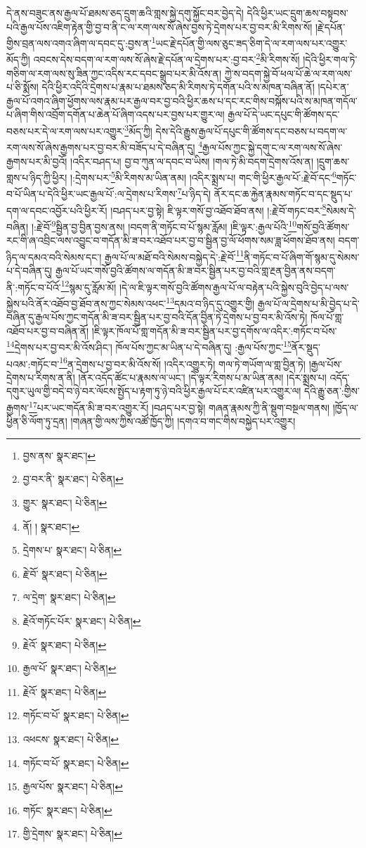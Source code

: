 དེ་ནས་བཟུང་ནས་རྒྱལ་པོ་ཐམས་ཅད་དྲུག་ཆའི་གླས་སྐྱེ་དགུ་སྐྱོང་བར་བྱེད་དེ། དེའི་ཕྱིར་ཡང་དྲུག་ཆས་བསྟབས་པའི་རྒྱལ་པོས་འཇིག་རྟེན་གྱི་བྱ་བ་ནི་ང་ལ་རག་ལས་སོ་ཞེས་བྱས་ཏེ་དྲེགས་པར་བྱ་བར་མི་རིགས་སོ། །རྗེ་དཔོན་གྱིས་བྲན་ལས་འགའ་ཞིག་ལ་དབང་དུ་:བྱས་ན་\footnote{བྱས་ནས་  སྣར་ཐང་། }ཡང་རྗེ་དཔོན་གྱི་ལས་ཅུང་ཟད་ཅིག་དེ་ལ་རག་ལས་པར་འགྱུར་མོད་ཀྱི། འབངས་དེས་བདག་ལ་རག་ལས་སོ་ཞེས་རྗེ་དཔོན་ལ་དྲེགས་པར་:བྱ་བར་\footnote{བྱ་བར་ནི་  སྣར་ཐང་།  པེ་ཅིན། }མི་རིགས་སོ། །དེའི་ཕྱིར་གལ་ཏེ་གཅིག་ལ་རག་ལས་སུ་ཟིན་ཀྱང་འདིས་རང་དབང་སྒྲུབ་པར་མི་འོས་ན། ཀྱེ་ས་བདག་སྐྱེ་བོ་ཕལ་པོ་ཆེ་ལ་རག་ལས་པ་ཅི་སྨོས། དེའི་ཕྱིར་འདིའི་དྲེགས་པ་རྣམ་པ་ཐམས་ཅད་མི་རིགས་ཏེ་དགོན་པའི་ས་མཁན་བཞིན་ནོ། །དཔེར་ན་རྒྱལ་པོ་འགའ་ཞིག་ཕྱོགས་ལས་རྣམ་པར་རྒྱལ་བར་བྱ་བའི་ཕྱིར་ཆས་པ་དང་རང་གིས་བསྐོས་པའི་ས་མཁན་གདོལ་པ་ཞིག་གིས་འབྲོག་དགོན་པ་ཆེན་པོ་ཞིག་འདས་པར་བྱས་པར་གྱུར་ལ། རྒྱལ་པོ་དེ་ཡང་དཔུང་གི་ཚོགས་དང་བཅས་པར་དེ་ལ་རག་ལས་པར་འགྱུར་\footnote{གྱུར་  སྣར་ཐང་།  པེ་ཅིན། }མོད་ཀྱི། དེས་དེའི་རྒྱུས་རྒྱལ་པོ་དཔུང་གི་ཚོགས་དང་བཅས་པ་བདག་ལ་རག་ལས་སོ་ཞེས་རྒྱགས་པར་བྱ་བར་མི་བཟོད་པ་དེ་བཞིན་དུ། \footnote{ནོ། །   སྣར་ཐང་། }རྒྱལ་པོས་ཀྱང་སྐྱེ་དགུ་ང་ལ་རག་ལས་སོ་ཞེས་རྒྱགས་པར་མི་བྱའོ། །འདིར་བཤད་པ། བྱ་བ་ཀུན་ལ་དབང་བ་ཡིས། །གལ་ཏེ་མི་བདག་དྲེགས་འོས་ན། །དྲུག་ཆས་གླས་པ་ཉིད་ཀྱི་ཕྱིར། །:དྲེགས་པར་\footnote{དྲེགས་པ་  སྣར་ཐང་།  པེ་ཅིན། }མི་རིགས་མ་ཡིན་ནམ། །འདིར་སྨྲས་པ། གང་གི་ཕྱིར་རྒྱལ་པོ་:རྗེ་བོ་དང་\footnote{རྗེ་བོ་  སྣར་ཐང་།  པེ་ཅིན། }གཏོང་བ་པོ་ཡིན་པ་དེའི་ཕྱིར་ཡང་རྒྱལ་པོ་:ལ་དྲེགས་པ་རིགས་\footnote{ལ་དྲེག་  སྣར་ཐང་།  པེ་ཅིན། }པ་ཉིད་དེ། ནོར་དང་ཆ་རྐྱེན་རྣམས་གཏོང་བ་དང་སྡུད་པ་དག་ལ་དབང་འབྱོར་པའི་ཕྱིར་རོ། །བཤད་པར་བྱ་སྟེ། ཇི་ལྟར་གསོ་བྱ་འཐོབ་ཐོབ་ནས། །:རྗེ་བོ་གཏང་བར་\footnote{རྗེའོ་གཏོང་པོར་  སྣར་ཐང་།  པེ་ཅིན། }སེམས་དེ་བཞིན། །:རྗེ་བོ་\footnote{རྗེའོ་  སྣར་ཐང་།  པེ་ཅིན། }སྦྱིན་བྱ་བྱིན་བྱས་ནས། །བདག་ནི་གཏོང་བ་པོ་སྙམ་རློམ། །ཇི་ལྟར་:རྒྱལ་པོའི་\footnote{རྒྱལ་པོ་  སྣར་ཐང་།  པེ་ཅིན། }གསོ་བྱའི་ཚོགས་རང་གི་ཞ་འབྲིང་ལས་འབྱུང་བ་གདོན་མི་ཟ་བར་འཐོབ་པར་བྱ་བ་སྦྱིན་བྱ་ལོ་ཕོགས་སམ་ཟླ་ཕོགས་ཐོབ་ནས། བདག་ཉིད་ལ་དམའ་བའི་སེམས་དང་། རྒྱལ་པོ་ལ་མཐོ་བའི་སེམས་བསྐྱེད་དེ་:རྗེ་བོ་\footnote{རྗེའོ་  སྣར་ཐང་།  པེ་ཅིན། }ནི་གཏོང་བ་པོ་ཞིག་གོ་སྙམ་དུ་སེམས་པ་དེ་བཞིན་དུ། རྒྱལ་པོ་ཡང་གསོ་བྱའི་ཚོགས་ལ་གདོན་མི་ཟ་བར་སྦྱིན་པར་བྱ་བའི་གླ་རྔན་བྱིན་ནས་བདག་ནི་:གཏོང་བ་པོའོ་\footnote{གཏོང་བ་པོ་  སྣར་ཐང་།  པེ་ཅིན། }སྙམ་དུ་རློམ་མོ། །དེ་ལ་ཇི་ལྟར་གསོ་བྱའི་ཚོགས་རྒྱལ་པོ་ལ་བརྟེན་པའི་སྐྱེས་བུའི་བྱེད་པ་ལས་སྐྱེས་པའི་ནོར་འཐོབ་བྱ་ཐོབ་ནས་ཀྱང་སེམས་འཕང་\footnote{འཕངས་  སྣར་ཐང་།  པེ་ཅིན། }དམའ་བ་ཉིད་དུ་འགྱུར་གྱི། རྒྱལ་པོ་ལ་དྲེགས་པ་མི་བྱེད་པ་དེ་བཞིན་དུ་རྒྱལ་པོས་ཀྱང་གདོན་མི་ཟ་བར་སྦྱིན་པར་བྱ་བའི་དོན་བྱིན་ཏེ་དྲེགས་པ་བྱ་བར་མི་འོས་ཏེ། ཁོལ་པོ་གླ་འཐོབ་པར་བྱ་བ་བཞིན་ནོ། །ཇི་ལྟར་ཁོལ་པོ་གླ་གདོན་མི་ཟ་བར་སྦྱིན་པར་བྱ་དགོས་ལ་འདིར་:གཏོང་བ་པོས་\footnote{གཏོང་བ་པོ་  སྣར་ཐང་།  པེ་ཅིན། }དྲེགས་པར་བྱ་བར་མི་འོས་ཤིང་། ཁོལ་པོས་ཀྱང་མ་ཡིན་པ་དེ་བཞིན་དུ། :རྒྱལ་པོས་ཀྱང་\footnote{རྒྱལ་པོས་  སྣར་ཐང་།  པེ་ཅིན། }ནོར་སྡུད་པའམ་:གཏོང་བ་\footnote{གཏོང་  སྣར་ཐང་།  པེ་ཅིན། }ན་དྲེགས་པ་བྱ་བར་མི་འོས་སོ། །འདིར་འགྱུར་ཏེ། གལ་ཏེ་གཡོག་ལ་གླ་བྱིན་ཏེ། །རྒྱལ་པོས་དྲེགས་པ་རིགས་ན་ནི། །ནོར་འདོད་ཚོང་པ་རྣམས་ལ་ཡང་། །དེ་ལྟར་རིགས་པ་མ་ཡིན་ནམ། །དེར་སྨྲས་པ། འདོད་དགུར་ཡུལ་གྱི་བདེ་བ་ཉེ་བར་ལོངས་སྤྱོད་པ་རྟག་ཏུ་ཉེ་བའི་ཕྱིར་རྒྱལ་པོ་ངར་འཛིན་པར་འགྱུར་ལ། དེའི་རྒྱུ་ཅན་:གྱིས་རྒྱགས་\footnote{གྱི་དྲེགས་  སྣར་ཐང་།  པེ་ཅིན། }པར་ཡང་གདོན་མི་ཟ་བར་འགྱུར་རོ། །བཤད་པར་བྱ་སྟེ། གཞན་རྣམས་ཀྱི་ནི་སྡུག་བསྔལ་གནས། །ཁྱོད་ལ་ཕྱིན་ཅི་ལོག་ཏུ་དྲན། །གཞན་གྱི་ལས་ཀྱིས་འཚོ་ཁྱོད་ཀྱི། །དགའ་བ་གང་གིས་བསྐྱེད་པར་འགྱུར། 